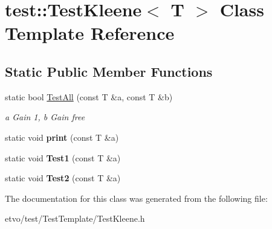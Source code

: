\hypertarget{classtest_1_1_test_kleene}{}\section{test\+:\+:Test\+Kleene$<$ T $>$ Class Template Reference}
\label{classtest_1_1_test_kleene}
\subsection*{Static Public Member Functions}
\begin{DoxyCompactItemize}
\item 
\mbox{\label{classtest_1_1_test_kleene_aa77c20aa8b5a25d5152591aadc9e6bf6}} 
static bool \mbox{\hyperlink{classtest_1_1_test_kleene_aa77c20aa8b5a25d5152591aadc9e6bf6}{Test\+All}} (const T \&a, const T \&b)
\begin{DoxyCompactList}\small\item\em a Gain 1, b Gain free \end{DoxyCompactList}\item 
\mbox{\label{classtest_1_1_test_kleene_a0f6773f01e2e8c9c1c86db2c7daaa560}} 
static void {\bfseries print} (const T \&a)
\item 
\mbox{\label{classtest_1_1_test_kleene_aa6f233a0daee33b4fcddb249cb73cd8a}} 
static void {\bfseries Test1} (const T \&a)
\item 
\mbox{\label{classtest_1_1_test_kleene_a85320079dc05edffd0df34eb5e079fa0}} 
static void {\bfseries Test2} (const T \&a)
\end{DoxyCompactItemize}


The documentation for this class was generated from the following file\+:\begin{DoxyCompactItemize}
\item 
etvo/test/\+Test\+Template/Test\+Kleene.\+h\end{DoxyCompactItemize}
